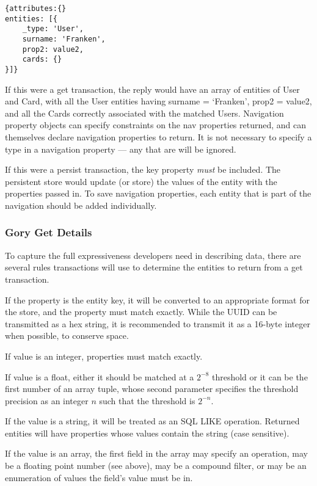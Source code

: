 \documentclass{article}
\begin{document}
\linespread{1}
\begin{lstlisting}
{attributes:{}
entities: [{
	_type: 'User',
	surname: 'Franken',
	prop2: value2,
	cards: {}
}]}
\end{lstlisting}
\linespread{1.6}

If this were a {\ilcode get} transaction, the reply would have an array of
entities of {\ilcode User} and {\ilcode Card}, with all the {\ilcode User}
entities having {\ilcode surname = `Franken', prop2 = value2}, and all the
{\ilcode Card}s correctly associated with the matched Users.  Navigation
property objects can specify constraints on the nav properties returned, and
can themselves declare navigation properties to return. It is not necessary to
specify a type in a navigation property --- any that are will be ignored.

If this were a {\ilcode persist} transaction, the {\ilcode key} property {\it
must} be included. The persistent store would update (or store) the values of
the entity with the properties passed in. To save navigation properties, each
entity that is part of the navigation should be added individually.

\subsubsection{Gory Get Details}

To capture the full expressiveness developers need in describing data, there are
several rules transactions will use to determine the entities to return from a
{\ilcode get} transaction.

If the property is the entity key, it will be converted to an appropriate format
for the store, and the property must match exactly. While the UUID can be
transmitted as a hex string, it is recommended to transmit it as a 16-byte
integer when possible, to conserve space.

If value is an integer, properties must match exactly.

If value is a float, either it should be matched at a $2^{-8}$ threshold or it
can be the first number of an array tuple, whose second parameter specifies the
threshold precision as an integer $n$ such that the threshold is $2^{-n}$.

If the value is a string, it will be treated as an SQL LIKE operation. Returned
entities will have properties whose values contain the string (case sensitive).

If the value is an array, the first field in the array may specify an operation,
may be a floating point number (see above), may be a compound filter, or may be
an enumeration of values the field's value must be {\ilcode in}.
\end{document}
